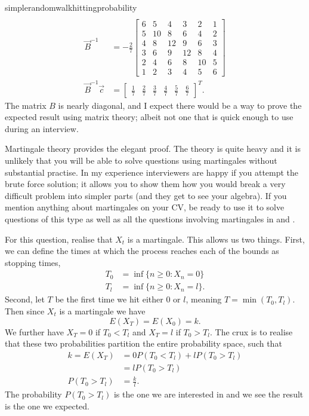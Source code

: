\begin{answer}{simplerandomwalkhittingprobability}
\begin{align*}
\\
\vec{B}^{-1} &=
-
\frac{2}{7}
\left[\begin{matrix}6 & 5 & 4 & 3 & 2 & 1\\5 & 10 & 8 & 6 & 4 & 2\\4 & 8 & 12 & 9 & 6 & 3\\3 & 6 & 9 & 12 & 8 & 4\\2 & 4 & 6 & 8 & 10 & 5\\1 & 2 & 3 & 4 & 5 & 6\end{matrix}\right]
\\
\vec{B}^{-1}\vec{c}
&=
\left[\begin{matrix}\frac{1}{7} & \frac{2}{7} & \frac{3}{7} & \frac{4}{7} & \frac{5}{7} & \frac{6}{7}\end{matrix}\right]^{T}
\text{.}
\end{align*}
The matrix $B$ is nearly diagonal, and I expect there would be a way to prove the expected result using matrix theory; albeit not one that is quick enough to use during an interview.

Martingale theory provides the elegant proof.
The theory is quite heavy and it is unlikely that you will be able to solve questions using martingales without substantial practise.
In my experience interviewers are happy if you attempt the brute force solution; it allows you to show them how you would break a very difficult problem into simpler parts (and they get to see your algebra).
If you mention anything about martingales on your CV, be ready to use it to solve questions of this type as well as all the questions involving martingales in \citet{JoshiQA} and \citet{HeardOnTheStreet}.

For this question, realise that $X_t$ is a martingale.
This allows us two things.
First, we can define
the times at which the process reaches each of the bounds as stopping times,
\begin{align*}
  T_0 &= \inf\{ n \geq 0: X_n = 0\} \\
  T_l &= \inf\{ n \geq 0: X_n = l\}
  \text{.}
\end{align*}
Second, let $T$ be the first time we hit either $0$ or $l$, meaning $T = \min(T_0 , T_l)$.
Then since $X_t$ is a martingale we have
\[
E(X_T) =  E(X_0) = k
\text{.}
\]
We further have
$X_T=0$ if $T_0 < T_l$
and
$X_T=l$ if $T_0 > T_l$.
The crux is to realise that these two probabilities partition the entire probability space, such that
\begin{align*}
k = E(X_T) &=  0 P(T_0 < T_l) + l P(T_0 > T_l) \\
           &=  l P(T_0 > T_l)  \\
P(T_0 > T_l) &= \frac{k}{l}
\text{.}
\end{align*}
The probability $P(T_0 > T_l)$ is the one we are interested in and we see the result is the one we expected.
\end{answer}
